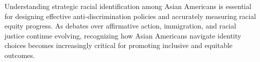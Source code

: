 Understanding strategic racial identification among Asian Americans is essential for designing effective anti-discrimination policies and accurately measuring racial equity progress. As debates over affirmative action, immigration, and racial justice continue evolving, recognizing how Asian Americans navigate identity choices becomes increasingly critical for promoting inclusive and equitable outcomes.